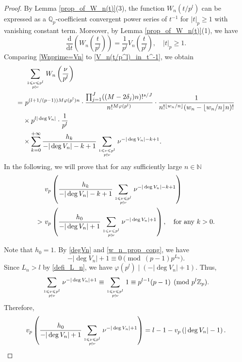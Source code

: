 \documentclass[12pt]{article}
\numberwithin{equation}{section}
\begin{document}
\begin{proof}
By Lemma \ref{prop_of_W_n(t)}(3), the function $W_n(t/p^l)$ can be expressed as a $\mathbb{Q}_p$-coefficient convergent power series of $t^{-1}$ for $|t|_p \geqslant 1$ with vanishing constant term. Moreover, by Lemma \ref{prop_of_W_n(t)}(1), we have
\begin{equation}\label{Wnprime=Vn}
\frac{\mathrm{d}}{\mathrm{d}t} \left( W_n\left( \frac{t}{p^l} \right) \right) = \frac{1}{p^l} V_n\left( \frac{t}{p^l} \right), \quad |t|_p \geqslant 1.
\end{equation}
Comparing \eqref{Wnprime=Vn} to \eqref{V_n(t/p^l)_in_t^-1}, we obtain
\begin{align}
&~\sum_{1 \leqslant \nu \leqslant p^l \atop p \nmid \nu} W_n\left( \frac{\nu}{p^l} \right) \\
=&~ p^{(l+1/(p-1))M\varphi(p^{l})n} \cdot \frac{\prod_{j=1}^{J} ((M-2\delta_j)n)!^{s/J}}{n!^{M\varphi(p^{l})}} \cdot \frac{1}{n!^{\lfloor w_n / n\rfloor}(w_n-\lfloor w_n / n\rfloor n)!} \notag\\
&\times p^{l|\deg V_n|} \cdot \frac{1}{p^l} \notag \\
&\times \sum_{k=0}^{+\infty} \frac{h_k}{-|\deg V_n|-k+1} \sum_{1 \leqslant \nu \leqslant p^l \atop p \nmid \nu} \nu^{-|\deg V_n|-k+1}.  \label{expression_sumWn}
\end{align}
In the following, we will prove that for any sufficiently large $n \in \mathbb{N}$
\begin{align}\label{claim}
	&~ v_p\left(  \frac{h_k}{-|\deg V_n|-k+1} \sum_{1 \leqslant \nu \leqslant p^l \atop p \nmid \nu} \nu^{-|\deg V_n|-k+1}  \right) \notag\\ 
	>&~ v_p\left(  \frac{h_0}{-|\deg V_n|+1} \sum_{1 \leqslant \nu \leqslant p^l \atop p \nmid \nu} \nu^{-|\deg V_n|+1} \right), \quad \text{for any~} k>0.
\end{align}

Note that $h_0 = 1$. By \eqref{degVn} and \eqref{w_n_prop_cong}, we have
\begin{equation}\label{1-|degVn|}
-|\deg V_n| + 1 \equiv 0 \pmod{(p-1)p^{L_n}}. 
\end{equation}
Since $L_n > l$ by \eqref{defi_L_n}, we have $\varphi(p^{l}) \mid (-|\deg V_n|+1)$. Thus,
\[ \sum_{1 \leqslant \nu \leqslant p^l \atop p \nmid \nu} \nu^{-|\deg V_n|+1}  \equiv  \sum_{1 \leqslant \nu \leqslant p^l \atop p \nmid \nu} 1 \equiv p^{l-1}(p-1) \pmod{p^l\mathbb{Z}_p}.   \]
Therefore,
\begin{equation}\label{v_p(0th)}
v_p\left(  \frac{h_0}{-|\deg V_n|+1} \sum_{1 \leqslant \nu \leqslant p^l \atop p \nmid \nu} \nu^{-|\deg V_n|+1} \right) = l-1 -v_p\left( |\deg V_n| - 1 \right).
\end{equation}


\end{proof}
\end{document}
